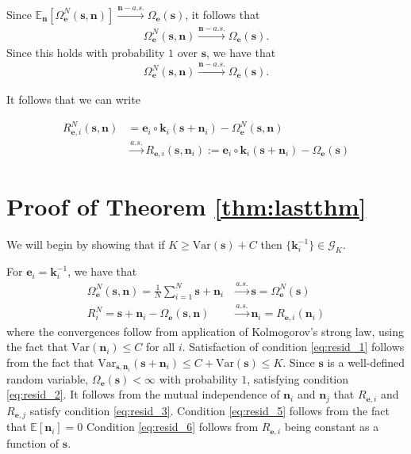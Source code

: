 Since $\mathbb{E}_{\bm{n}}[\Omega_{\bm{e}}^N(\bm{s}, \bm{n})] \overset{\bm{n}-a.s.}{\longrightarrow} \Omega_{\bm{e}}(\bm{s})$, it follows that
\begin{align*}
\Omega_{\bm{e}}^N(\bm{s}, \bm{n}) \overset{\bm{n}-a.s.}{\longrightarrow} \Omega_{\bm{e}}(\bm{s}).
\end{align*}
Since this holds with probability $1$ over $\bm{s}$, we have that
\begin{align*}
\Omega_{\bm{e}}^N(\bm{s}, \bm{n}) \overset{\bm{n}-a.s.}{\longrightarrow} \Omega_{\bm{e}}(\bm{s}).
\end{align*}

It follows that we can write

\begin{align*}
R_{\bm{e}, i}^N(\bm{s}, \bm{n}) &= \bm{e}_i\circ \bm{k}_i( \bm{s} + \bm{n}_i) - \Omega_{\bm{e}}^N(\bm{s}, \bm{n}) \\
&\overset{a.s.}{\longrightarrow} R_{\bm{e}, i}(\bm{s}, \bm{n}_i):= \bm{e}_i\circ \bm{k}_i( \bm{s} + \bm{n}_i) - \Omega_{\bm{e}}(\bm{s})
\end{align*}


\section{Proof of Theorem \ref{thm:lastthm}}
\label{sec:lasttmpr}

We will begin by showing that if $K \geq \mathrm{Var}(\bm{s}) + C$ then $\{ \bm{k}^{-1}_i \}  \in \mathcal{G}_K$.

For $\bm{e}_i = \bm{k}_i^{-1}$, we have that
\begin{align*}
\Omega_{\bm{e}}^N(\bm{s}, \bm{n}) = \frac{1}{N} \sum_{i=1}^N \bm{s} + \bm{n}_i &\overset{a.s.}{\longrightarrow} \bm{s} = \Omega_{\bm{e}}^N(\bm{s})\\
R_i^N = \bm{s} + \bm{n}_i - \Omega_{\bm{e}}(\bm{s}, \bm{n})  &\overset{a.s.}{\longrightarrow} \bm{n}_i = R_{\bm{e}, i}(\bm{n}_i)
\end{align*}
where the convergences follow from application of Kolmogorov's strong law, using the fact that $\mathrm{Var}(\bm{n}_i) \leq C$ for all $i$.
Satisfaction of condition \ref{eq:resid_1} follows from the fact that $\mathrm{Var}_{\bm{s}, \bm{n}_i} (\bm{s} + \bm{n}_i) \leq C + \mathrm{Var}(\bm{s}) \leq K$.
Since $\bm{s}$ is a well-defined random variable,  $\Omega_{\bm{e}}(\bm{s}) < \infty$ with probability $1$, satisfying condition \ref{eq:resid_2}.
It follows from the mutual independence of $\bm{n}_i$ and $\bm{n}_j$ that $R_{\bm{e}, i}$ and $R_{\bm{e}, j}$ satisfy condition \ref{eq:resid_3}.
Condition \ref{eq:resid_5} follows from the fact that $\mathbb{E}[\bm{n}_i]=0$
Condition \ref{eq:resid_6} follows from $R_{\bm{e}, i}$ being constant as a function of $\bm{s}$.

